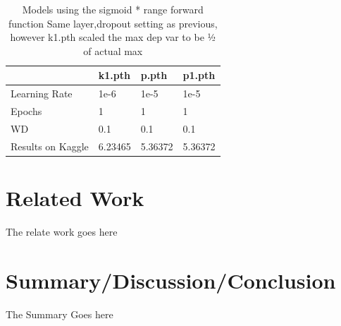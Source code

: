 \documentclass[10pt,twocolumn,letterpaper]{article}
\begin{document}
\begin{table}[]
  \begin{center}
    \begin{tabular}{|l|l|l|l|}
    \hline
                      & k1.pth  & p.pth   & p1.pth  \\ \hline
    Learning Rate     & 1e-6    & 1e-5    & 1e-5    \\ \hline
    Epochs            & 1       & 1       & 1       \\ \hline
    WD                & 0.1     & 0.1     & 0.1     \\ \hline
    Results on Kaggle & 6.23465 & 5.36372 & 5.36372 \\ \hline
    \end{tabular}
  \end{center}
  \caption{Models using the sigmoid * range forward function Same layer,dropout
  setting as previous, however k1.pth scaled the max dep var to be ½ of actual
  max}
\end{table}


\section{Related Work}
The relate work goes here

\section{Summary/Discussion/Conclusion}
The Summary Goes here










\end{document}
